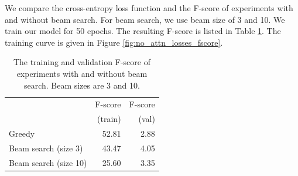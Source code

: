 \documentclass[11pt,a4paper]{article}
\begin{document}
    We compare the cross-entropy loss function and the F-score of experiments with and without beam search. For beam search, we use beam size of 3 and 10. We train our model for 50 epochs. The resulting F-score is listed in Table \ref{tab:beam}. The training curve is given in Figure \ref{fig:no_attn_losses_fscore}.


\begin{table}[ht]
\centering
\caption{The training and validation F-score of experiments with and without beam search. Beam sizes are 3 and 10.}
\label{tab:beam}
\begin{tabular}{lrr}
\toprule
                  & F-score  & F-score    \\
                  & (train)  & (val)    \\ \midrule
Greedy            & 52.81            & 2.88                    \\
Beam search (size 3)   & 43.47            & 4.05                    \\
Beam search (size 10)  & 25.60            & 3.35                    \\ \bottomrule
\end{tabular}
\end{table}
\end{document}
